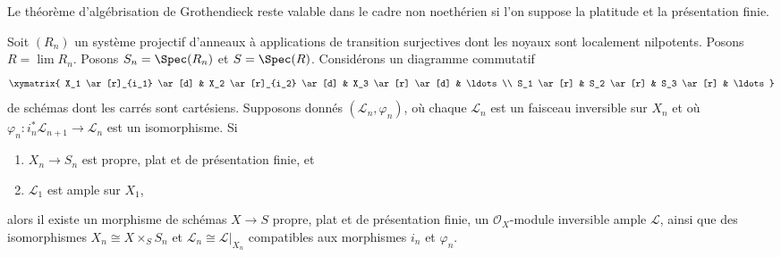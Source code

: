 \begin{lemma}
\label{lemma-polarized-strong-effectiveness}
\begin{slogan}
Le théorème d'algébrisation de Grothendieck reste valable dans le cadre non
noethérien si l'on suppose la platitude et la présentation finie.
\end{slogan}
Soit $(R_n)$ un système projectif d'anneaux à applications de transition
surjectives dont les noyaux sont localement nilpotents. Posons
$R = \lim R_n$.
Posons $S_n = \Spec(R_n)$ et $S = \Spec(R)$. Considérons un diagramme
commutatif
$$
\xymatrix{
X_1 \ar[r]_{i_1} \ar[d] & X_2 \ar[r]_{i_2} \ar[d] & X_3 \ar[r] \ar[d] &
\ldots \\
S_1 \ar[r] & S_2 \ar[r] & S_3 \ar[r] & \ldots
}
$$
de schémas dont les carrés sont cartésiens. Supposons donnés
$(\mathcal{L}_n, \varphi_n)$, où chaque $\mathcal{L}_n$ est un faisceau
inversible sur $X_n$ et où
$\varphi_n : i_n^*\mathcal{L}_{n + 1} \to \mathcal{L}_n$ est un isomorphisme.
Si
\begin{enumerate}
\item $X_n \to S_n$ est propre, plat et de présentation finie, et
\item $\mathcal{L}_1$ est ample sur $X_1$,
\end{enumerate}
alors il existe un morphisme de schémas $X \to S$ propre, plat et de
présentation finie, un $\mathcal{O}_X$-module inversible ample
$\mathcal{L}$, ainsi que des isomorphismes
$X_n \cong X \times_S S_n$ et
$\mathcal{L}_n \cong \mathcal{L}|_{X_n}$ compatibles aux morphismes $i_n$ et
$\varphi_n$.
\end{lemma}

